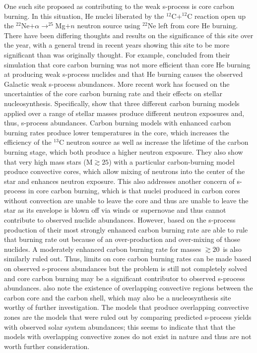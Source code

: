 One such site proposed as contributing to the weak s-process 
is core carbon burning.  In this situation, He nuclei liberated by the
$^{12}$C$+^{12}$C reaction open up the $^{22}$Ne$+ \alpha \rightarrow
^{25}$Mg$+n$ neutron source using $^{22}$Ne left from core He
burning. There have been differing thoughts and results on the
significance of this site over the year, with a general trend in
recent years showing this site to be more significant than was
originally thought.  For example, \cite{arcoragi1991} concluded from their
simulation that core carbon burning was not more efficient than core
He burning at producing weak s-process nuclides and that He burning
causes the observed Galactic weak s-process abundances.  More recent
work has focused on the uncertainties of the core carbon burning rate and
their effects on stellar nucleosynthesis.  Specifically, \cite{bennettetal2012}
show that three different carbon burning models applied over a range
of stellar masses produce different
neutron exposures and, thus, s-process abundances.  Carbon burning
models with enhanced carbon burning rates produce lower temperatures
in the core, which
increases the efficiency of the $^{13}$C
neutron source as well as increase the lifetime of the carbon burning
stage, which both produce a higher neutron exposure.  They also show that very
high mass stars (M$\gtrsim25$\Msol) with a particular carbon-burning
model produce convective cores, which allow mixing of neutrons into
the center of the star and enhances neutron exposure.  This also
addresses another concern of s-process in core carbon burning, which
is that nuclei produced in carbon cores without convection are unable
to leave the core and thus are unable to leave the star as its
envelope is blown off via winds or supernovae and thus cannot
contribute to observed nuclide abundances.  However, based on the
s-process production of their most strongly enhanced carbon burning
rate \cite{bennettetal2012} are able to rule that burning rate out because of an
over-production and over-mixing of those nuclides.  A moderately enhanced carbon
burning rate for masses $\gtrsim 20$\Msol\ is also similarly ruled
out.  Thus, limits on core carbon burning rates can be made based on
observed s-process abundances but the problem is still not completely
solved and core carbon burning may be a significant contributor to
observed s-process abundances.  \cite{bennettetal2012} also note the
existence of overlapping convective regions between the carbon core
and the carbon shell, which may also be a nucleosynthesis site worthy
of further investigation. The models that produce overlapping
convective zones are the models that were ruled out by comparing
predicted s-process yields with observed solar system abundances; this
seems to indicate that that the models with overlapping convective
zones do not exist in nature and thus are not worth further
consideration.

